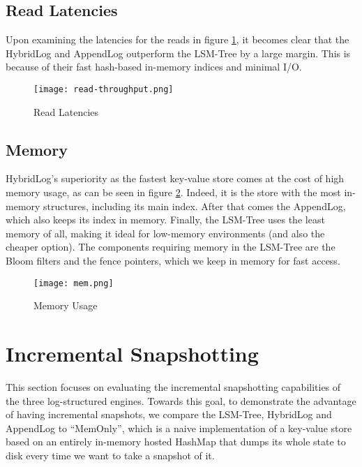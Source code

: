 \subsection{Read Latencies}

Upon examining the latencies for the reads in figure \ref{fig:comparison-read-latencies}, it becomes clear that the HybridLog and AppendLog outperform the LSM-Tree by a large margin. This is because of their fast hash-based in-memory indices and minimal I/O.

\begin{figure}[h]
    \centering
    \texttt{[image: read-throughput.png]}
    \caption{Read Latencies}
    \label{fig:comparison-read-latencies}
\end{figure}

\subsection{Memory}

HybridLog's superiority as the fastest key-value store comes at the cost of high memory usage, as can be seen in figure \ref{fig:comparison-memory}. Indeed, it is the store with the most in-memory structures, including its main index. After that comes the AppendLog, which also keeps its index in memory. Finally, the LSM-Tree uses the least memory of all, making it ideal for low-memory environments (and also the cheaper option). The components requiring memory in the LSM-Tree are the Bloom filters and the fence pointers, which we keep in memory for fast access.

\begin{figure}[h]
    \centering
    \texttt{[image: mem.png]}
    \caption{Memory Usage}
    \label{fig:comparison-memory}
\end{figure}

\section{Incremental Snapshotting}

This section focuses on evaluating the incremental snapshotting capabilities of the three log-structured engines. Towards this goal, to demonstrate the advantage of having incremental snapshots, we compare the LSM-Tree, HybridLog and AppendLog to ``MemOnly'', which is a naive implementation of a key-value store based on an entirely in-memory hosted HashMap that dumps its whole state to disk every time we want to take a snapshot of it.

